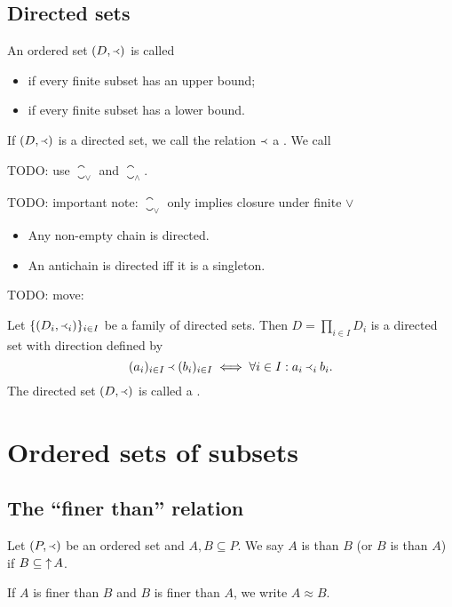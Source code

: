 \subsection{Directed sets}
\begin{definition}
An ordered set $(D,\Yleft)$ is called
\begin{itemize}
\item {} if every finite subset has an upper bound;
\item {} if every finite subset has a lower bound.
\end{itemize}
If $(D,\Yleft)$ is a directed set, we call the relation $\Yleft$ a .
We call 
\end{definition}
TODO: use $\closure_\vee$ and $\closure_\wedge$.

TODO: important note: $\closure_\vee$ only implies closure under finite $\vee$

\begin{example}
\begin{itemize}
\item Any non-empty chain is directed.
\item An antichain is directed iff it is a singleton.
\end{itemize}
\end{example}

TODO: move:
\begin{proposition}
Let $\{(D_i,\Yleft_i)\}_{i\in I}$ be a family of directed sets. Then $D= \prod_{i\in I}D_i$ is a directed set with direction defined by
\[ (a_i)_{i\in I} \Yleft (b_i)_{i\in I} \iff \forall i\in I: a_i\Yleft_i b_i. \]
The directed set $(D,\Yleft)$ is called a .
\end{proposition}


\section{Ordered sets of subsets}
\subsection{The ``finer than'' relation}
\begin{definition}
Let $\left( P,\Yleft \right)$ be an ordered set and $A,B \subseteq P$. We say $A$ is  than $B$ (or $B$ is  than $A$) if $B\subseteq \mathop{\uparrow} A$.

If $A$ is finer than $B$ and $B$ is finer than $A$, we write $A \approx B$.
\end{definition}


